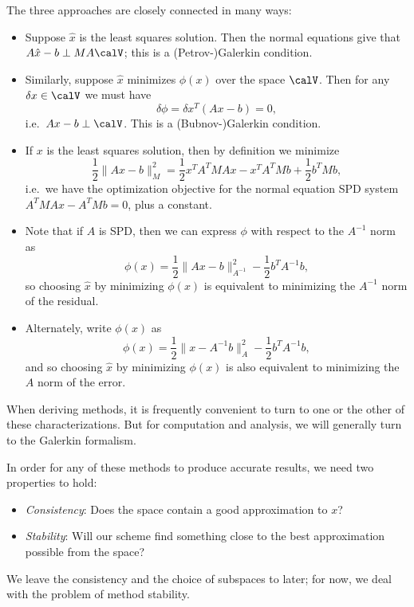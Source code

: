 The three approaches are closely connected in many ways:
\begin{itemize}
\item
  Suppose $\hat{x}$ is the least squares solution.  Then the normal
  equations give that $A\hat{x}-b \perp M A\calV$; this is a
  (Petrov-)Galerkin condition.
\item
  Similarly, suppose $\hat{x}$ minimizes $\phi(x)$ over the space
  $\calV$.  Then for any $\delta x \in \calV$ we must have
  \[
    \delta \phi = \delta x^T (Ax-b) = 0,
  \]
  i.e.~$Ax-b \perp \calV$.  This is a (Bubnov-)Galerkin condition.
\item
  If $x$ is the least squares solution, then by definition
  we minimize
  \[
    \frac{1}{2} \|Ax-b\|_M^2 = \frac{1}{2} x^T A^T M A x - x^T A^T M b + \frac{1}{2} b^T M b,
  \]
  i.e.~we have the optimization objective for the normal equation
  SPD system $A^T M A x - A^T M b = 0$, plus a constant.
\item
  Note that if $A$ is SPD, then we can express $\phi$ with respect to
  the $A^{-1}$ norm as
  \[
    \phi(x) = \frac{1}{2} \|Ax-b\|_{A^{-1}}^2 - \frac{1}{2} b^T A^{-1} b,
  \]
  so choosing $\hat{x}$ by minimizing $\phi(x)$ is equivalent to
  minimizing the $A^{-1}$ norm of the residual.
\item
  Alternately, write $\phi(x)$ as
  \[
    \phi(x) = \frac{1}{2} \|x-A^{-1} b\|_A^2 - \frac{1}{2} b^T A^{-1} b,
  \]
  and so choosing $\hat{x}$ by minimizing $\phi(x)$ is also
  equivalent to minimizing the $A$ norm of the error.
\end{itemize}
When deriving methods, it is frequently convenient to turn to one or
the other of these characterizations.  But for computation and analysis,
we will generally turn to the Galerkin formalism.

In order for any of these methods to produce accurate results, we need
two properties to hold:
\begin{itemize}
\item {\em Consistency}: Does the space contain a good approximation to $x$?
\item {\em Stability}: Will our scheme find something close to the best
  approximation possible from the space?
\end{itemize}
We leave the consistency and the choice of subspaces to later; for now,
we deal with the problem of method stability.
